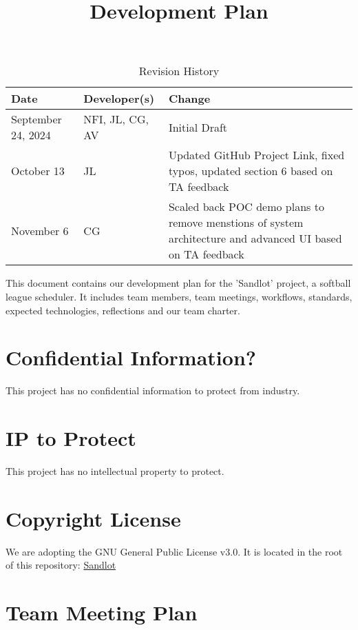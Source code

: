 \documentclass{article}
\title{Development Plan\\\progname}
\author{\authname}
\date{}
\begin{document}
\maketitle

\begin{table}[hp]
\caption{Revision History} \label{TblRevisionHistory}
\begin{tabularx}{\textwidth}{llX}
\toprule
\textbf{Date} & \textbf{Developer(s)} & \textbf{Change}\\
\midrule
September 24, 2024 & NFI, JL, CG, AV & Initial Draft\\
October 13 & JL & Updated GitHub Project Link, fixed typos, updated section 6 based on TA feedback\\
November 6 & CG & Scaled back POC demo plans to remove menstions of system architecture and advanced UI based on TA feedback\\
\bottomrule
\end{tabularx}
\end{table}

\newpage{}

This document contains our development plan for the 'Sandlot' project, a
softball league scheduler. It includes team members, team meetings, workflows,
standards, expected technologies, reflections and our team charter.

\section{Confidential Information?}

This project has no confidential information to protect from industry.

\section{IP to Protect}

This project has no intellectual property to protect.

\section{Copyright License}

We are adopting the GNU General Public License v3.0. It is located 
in the root of this repository: \href{https://github.com/Nicholas-Fabugais-Inaba/Sandlot/blob/main/LICENSE}{Sandlot}

\section{Team Meeting Plan}
\end{document}
